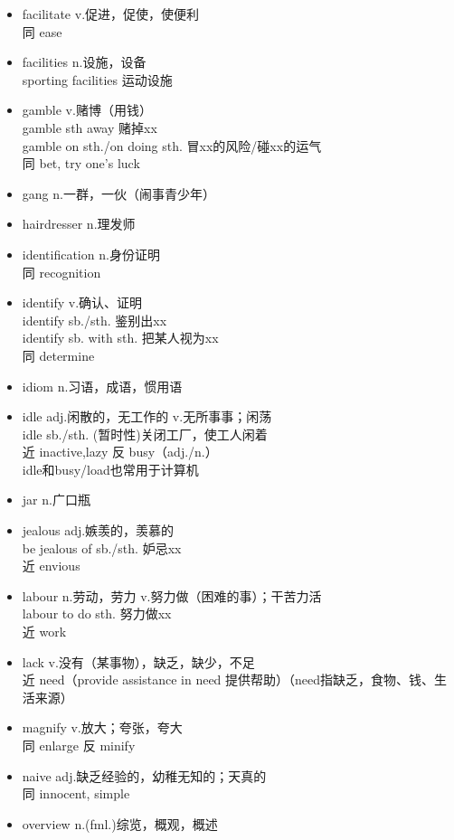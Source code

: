 \documentclass[11pt,a4paper,UTF8,titlepage]{ctexrep} %
\begin{document}
\begin{multicols}{2}
\begin{itemize}
        \item facilitate v.促进，促使，使便利\\同 ease
        \item facilities n.设施，设备\\sporting facilities 运动设施
        \item gamble v.赌博（用钱）\\gamble sth away 赌掉xx\\gamble on sth./on doing sth. 冒xx的风险/碰xx的运气\\同 bet, try one's luck
        \item gang n.一群，一伙（闹事青少年）
        \item hairdresser n.理发师
        \item identification n.身份证明\\同 recognition
        \item identify v.确认、证明\\identify sb./sth. 鉴别出xx\\identify sb. with sth. 把某人视为xx\\同 determine
        \item idiom n.习语，成语，惯用语
        \item idle adj.闲散的，无工作的 v.无所事事；闲荡\\idle sb./sth. (暂时性)关闭工厂，使工人闲着\\近 inactive,lazy 反 busy（adj./n.）\\idle和busy/load也常用于计算机
        \item jar n.广口瓶
        \item jealous adj.嫉羡的，羡慕的\\be jealous of sb./sth. 妒忌xx\\近 envious
        \item labour n.劳动，劳力 v.努力做（困难的事）；干苦力活\\labour to do sth. 努力做xx\\近 work
        \item lack v.没有（某事物），缺乏，缺少，不足\\近 need（provide assistance in need 提供帮助）（need指缺乏，食物、钱、生活来源）
        \item magnify v.放大；夸张，夸大\\同 enlarge 反 minify
        \item naive adj.缺乏经验的，幼稚无知的；天真的\\同 innocent, simple
        \item overview n.(fml.)综览，概观，概述

\end{itemize}
\end{multicols}
\end{document}
